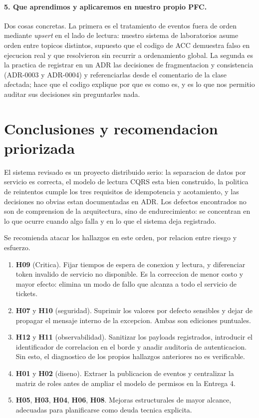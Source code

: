 \documentclass[10pt,a4paper]{article}
\begin{document}
\paragraph{5. Que aprendimos y aplicaremos en nuestro propio PFC.}
Dos cosas concretas. La primera es el tratamiento de eventos fuera de orden mediante
\emph{upsert} en el lado de lectura: nuestro sistema de laboratorios asume orden entre
topicos distintos, supuesto que el codigo de ACC demuestra falso en ejecucion real y que
resolvieron sin recurrir a ordenamiento global. La segunda es la practica de registrar en un
ADR las decisiones de fragmentacion y consistencia (ADR-0003 y ADR-0004) y referenciarlas
desde el comentario de la clase afectada; hace que el codigo explique por que es como es, y
es lo que nos permitio auditar sus decisiones sin preguntarles nada.

\section{Conclusiones y recomendacion priorizada}

El sistema revisado es un proyecto distribuido serio: la separacion de datos por servicio es
correcta, el modelo de lectura CQRS esta bien construido, la politica de reintentos cumple
los tres requisitos de idempotencia y acotamiento, y las decisiones no obvias estan
documentadas en ADR. Los defectos encontrados no son de comprension de la arquitectura, sino
de endurecimiento: se concentran en lo que ocurre cuando algo falla y en lo que el sistema
deja registrado.

Se recomienda atacar los hallazgos en este orden, por relacion entre riesgo y esfuerzo.

\begin{enumerate}[leftmargin=*]
\item \textbf{H09} (Critica). Fijar tiempos de espera de conexion y lectura, y diferenciar
token invalido de servicio no disponible. Es la correccion de menor costo y mayor efecto:
elimina un modo de fallo que alcanza a todo el servicio de tickets.
\item \textbf{H07} y \textbf{H10} (seguridad). Suprimir los valores por defecto sensibles y
dejar de propagar el mensaje interno de la excepcion. Ambas son ediciones puntuales.
\item \textbf{H12} y \textbf{H11} (observabilidad). Sanitizar los payloads registrados,
introducir el identificador de correlacion en el borde y anadir auditoria de autenticacion.
Sin esto, el diagnostico de los propios hallazgos anteriores no es verificable.
\item \textbf{H01} y \textbf{H02} (diseno). Extraer la publicacion de eventos y centralizar
la matriz de roles antes de ampliar el modelo de permisos en la Entrega 4.
\item \textbf{H05}, \textbf{H03}, \textbf{H04}, \textbf{H06}, \textbf{H08}. Mejoras
estructurales de mayor alcance, adecuadas para planificarse como deuda tecnica explicita.
\end{enumerate}
\end{document}
